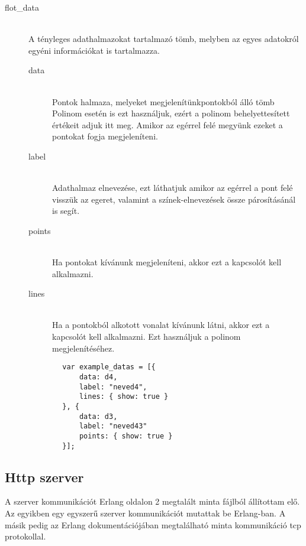\begin{description}
 		\item[flot\_data] \hfill \\ 
 		A tényleges adathalmazokat tartalmazó tömb, melyben az egyes adatokról egyéni információkat is tartalmazza.\newline
 		\begin{description}
			\item[data] \hfill \\ 
			Pontok halmaza, melyeket megjelenítünk\newline
			[x, y] pontokból álló tömb\newline
			Polinom esetén is ezt használjuk, ezért a polinom behelyettesített értékeit adjuk itt meg. Amikor az egérrel felé megyünk ezeket a pontokat fogja megjeleníteni.
			\item[label] \hfill \\ 
			Adathalmaz elnevezése, ezt láthatjuk amikor az egérrel a pont felé visszük az egeret, valamint a színek-elnevezések össze párosításánál is segít.
			\item[points] \hfill \\ 
			Ha pontokat kívánunk megjeleníteni, akkor ezt a kapcsolót kell alkalmazni.
			\item[lines] \hfill \\ 
			Ha a pontokból alkotott vonalat kívánunk látni, akkor ezt a kapcsolót kell alkalmazni. Ezt használjuk a polinom megjelenítéséhez.
		\end{description}
 		\begin{verbatim}
		var example_datas = [{
		    data: d4,
		    label: "neved4",
		    lines: { show: true }
		}, {
		    data: d3,
		    label: "neved43"
		    points: { show: true }
		}];
		\end{verbatim}
	\end{description}

\subsection{Http szerver}
	A szerver kommunikációt Erlang oldalon 2 megtalált minta fájlból állítottam elő. Az egyikben egy egyszerű szerver kommunikációt mutattak be Erlang-ban\cite{simpleserver}. \newline
	A másik pedig az Erlang dokumentációjában megtalálható minta kommunikáció tcp protokollal\cite{tcpserver}.

